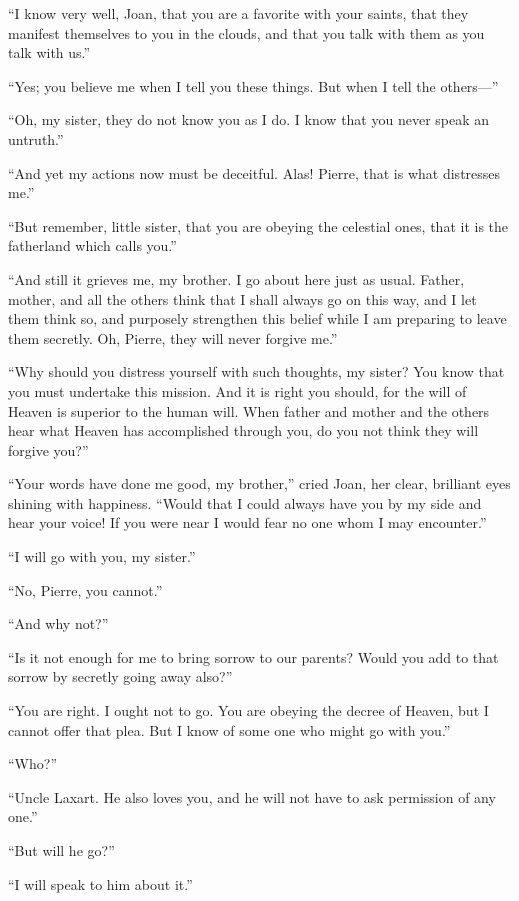 ``I know very well, Joan, that you are a favorite with your saints, that
they manifest themselves to you in the clouds, and that you talk with
them as you talk with us.''

``Yes; you believe me when I tell you these things. But when I tell the
others---''

``Oh, my sister, they do not know you as I do. I know that you never
speak an untruth.''

``And yet my actions now must be deceitful. Alas! Pierre, that is what
distresses me.''

``But remember, little sister, that you are obeying the celestial ones,
that it is the fatherland which calls you.''

``And still it grieves me, my brother. I go about here just as usual.
Father, mother, and all the others think that I shall always go on this
way, and I let them think so, and purposely strengthen this belief while
I am preparing to leave them secretly. Oh, Pierre, they will never
forgive me.''

``Why should you distress yourself with such thoughts, my sister? You
know that you must undertake this mission. And it is right you should,
for the will of Heaven is superior to the human will. When father and
mother and the others hear what Heaven has accomplished through you, do
you not think they will forgive you?''

``Your words have done me good, my brother,'' cried Joan, her clear,
brilliant eyes shining with happiness. ``Would that I could always have
you by my side and hear your voice! If you were near I would fear no one
whom I may encounter.''

``I will go with you, my sister.''

``No, Pierre, you cannot.''

``And why not?''

``Is it not enough for me to bring sorrow to our parents? Would you add
to that sorrow by secretly going away also?''

``You are right. I ought not to go. You are obeying the decree of
Heaven, but I cannot offer that plea. But I know of some one who might
go with you.''

``Who?''

``Uncle Laxart. He also loves you, and he will not have to ask
permission of any one.''

``But will he go?''

``I will speak to him about it.''

